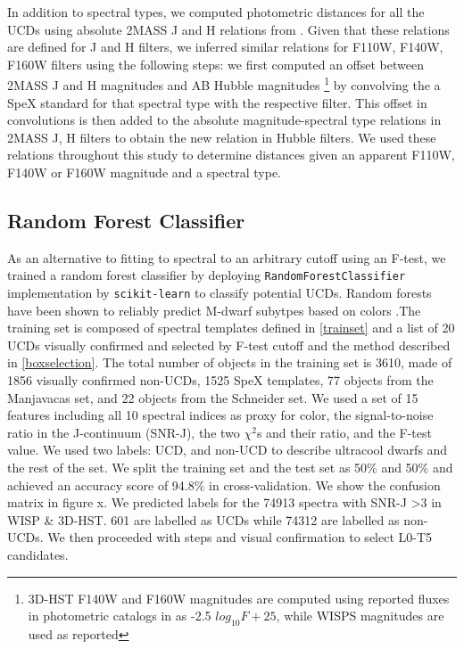 \documentclass[manuscript]{aastex}
\begin{document}
In addition to spectral types, we computed photometric distances for all the UCDs using absolute 2MASS J and H relations from  \cite{2012ApJS..201...19D}. Given that these relations are defined for J and H filters, we inferred similar relations for F110W, F140W, F160W filters using the following steps: we first computed an offset between 2MASS J and H magnitudes and AB Hubble magnitudes  \footnote{3D-HST F140W and F160W magnitudes are computed using reported fluxes in photometric catalogs in \citealt{Skelton2014} as -2.5  $log_{10}F+ 25$, while WISPS magnitudes are used as reported } by convolving the a SpeX standard for that spectral type with the respective filter. This offset in convolutions is then added to the absolute magnitude-spectral type relations in 2MASS J, H filters to obtain the new relation in Hubble filters. 
We used these relations throughout this study to determine distances given an apparent F110W, F140W or F160W magnitude and a spectral type. 

\subsection{Random Forest Classifier}

As an alternative to fitting to spectral to an arbitrary cutoff using an F-test, we trained a random forest classifier by deploying \texttt{RandomForestClassifier} implementation by \texttt{scikit-learn} \citealt{2012arXiv1201.0490P} to classify potential UCDs.  Random forests have been shown to reliably predict M-dwarf subytpes based on colors \citep{2019arXiv190505900H}.The training set is composed of spectral templates defined in \ref{trainset} and a list of 20 UCDs visually confirmed and selected by F-test cutoff and the method described in \ref{boxselection}. The total number of objects in the training set is 3610, made of 1856 visually confirmed non-UCDs, 1525 SpeX templates, 77 objects from the Manjavacas set, and 22 objects from the Schneider set. We used a set of 15 features including all 10 spectral indices as proxy for color, the signal-to-noise ratio in the J-continuum (SNR-J), the two $\chi^2$s and their ratio, and the F-test value. We used two labels: UCD, and non-UCD to describe ultracool dwarfs and the rest of the set. We split the training set and the test set as 50\%  and 50\% and achieved an accuracy score of 94.8\% in cross-validation.  We show the confusion matrix in figure x. We predicted labels for the 74913 spectra with SNR-J \textgreater 3 in WISP \& 3D-HST. 601 are labelled as UCDs while 74312 are labelled as non-UCDs. We then proceeded with steps \label{boxselection} and visual confirmation to select L0-T5 candidates. 
\end{document}
